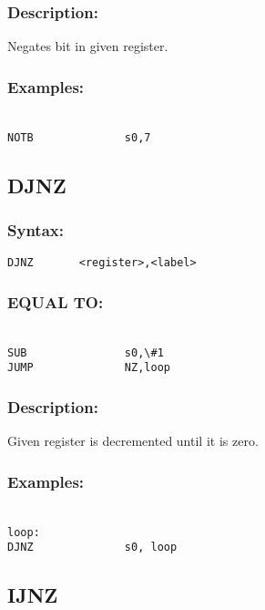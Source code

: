 {        \subsubsection{Description:}
            Negates bit in given register.

        \subsubsection{Examples:}
        {
            ~\\
            \usecodefont
            \verb'NOTB              s0,7'\\
        }

    \subsection{DJNZ}
        \subsubsection{Syntax:}
            \verb'DJNZ       <register>,<label>'

        \subsubsection{EQUAL TO:}
        {
            ~\\
            \usecodefont
            \verb'SUB               s0,\#1'\\
            \verb'JUMP              NZ,loop'\\
        }
        \subsubsection{Description:}
            Given register is decremented until it is zero.

        \subsubsection{Examples:}
        {
            ~\\
            \usecodefont
            \verb'loop:             '\\
            \verb'DJNZ              s0, loop'\\
        }

    \subsection{IJNZ}
}
